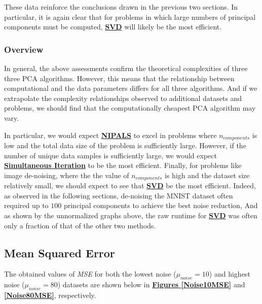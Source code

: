 \documentclass[12pt]{article}
\begin{document}
These data reinforce the conclusions drawn in the previous two sections. In particular, it is again clear that for problems in which large numbers of principal components must be computed, \textbf{\hyperref[3.2]{SVD}} will likely be the most efficient. 

\subsubsection{Overview}\label{5.1.5}

In general, the above assessments confirm the theoretical complexities of three three PCA algorithms. However, this means that the relationship between computational and the data parameters differs for all three algorithms. And if we extrapolate the complexity relationships observed to additional datasets and problems, we should find that the computationally cheapest PCA algorithm may vary. 

In particular, we would expect \textbf{\hyperref[3.1]{NIPALS}} to excel in problems where $n_{components}$ is low and the total data size of the problem is sufficiently large. However, if the number of unique data samples is sufficiently large, we would expect \textbf{\hyperref[3.3]{Simultaneous Iteration}} to be the most efficient. Finally, for problems like image de-noising, where the the value of $n_{components}$ is high and the dataset size relatively small, we should expect to see that \textbf{\hyperref[3.2]{SVD}} be the most efficient.
Indeed, as observed in the following sections, de-noising the MNIST dataset often required up to $100$ principal components to achieve the best noise reduction, And as shown by the unnormalized graphs above, the raw runtime for \textbf{\hyperref[3.2]{SVD}} was often only a fraction of that of the other two methods. 

\subsection{Mean Squared Error}\label{5.2}

The obtained values of \textit{MSE} for both the lowest noise ($\mu_{noise}=10$) and highest noise ($\mu_{noise}=80$) datasets are shown below in \textbf{\hyperref[Noise10MSE]{Figures \ref*{Noise10MSE}}} and \textbf{\hyperref[Noise80MSE]{\ref*{Noise80MSE}}}, respectively.
\end{document}

